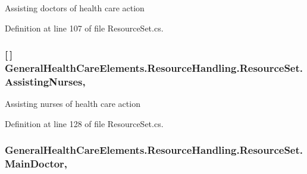 Assisting doctors of health care action 



Definition at line 107 of file Resource\+Set.\+cs.

\subsubsection[{\texorpdfstring{Assisting\+Nurses}{AssistingNurses}}]{ \mbox{[}$\,$\mbox{]} General\+Health\+Care\+Elements.\+Resource\+Handling.\+Resource\+Set.\+Assisting\+Nurses\hspace{0.3cm}{\ttfamily [get]}, {\ttfamily [set]}}\hypertarget{class_general_health_care_elements_1_1_resource_handling_1_1_resource_set_a54c029cc1ba4f1529750d19c1c36e7fb}{}\label{class_general_health_care_elements_1_1_resource_handling_1_1_resource_set_a54c029cc1ba4f1529750d19c1c36e7fb}


Assisting nurses of health care action 



Definition at line 128 of file Resource\+Set.\+cs.

\subsubsection[{\texorpdfstring{Main\+Doctor}{MainDoctor}}]{ General\+Health\+Care\+Elements.\+Resource\+Handling.\+Resource\+Set.\+Main\+Doctor\hspace{0.3cm}{\ttfamily [get]}, {\ttfamily [set]}}\hypertarget{class_general_health_care_elements_1_1_resource_handling_1_1_resource_set_a867a08615f6caa7f2c7c96ef216a8098}{}\label{class_general_health_care_elements_1_1_resource_handling_1_1_resource_set_a867a08615f6caa7f2c7c96ef216a8098}



